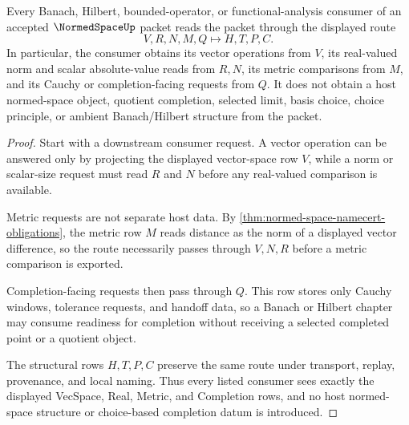 \begin{theorem}
\label{thm:normed-space-completion-handoff}
Every Banach, Hilbert, bounded-operator, or functional-analysis consumer of an accepted $\NormedSpaceUp$ packet reads the packet through the displayed route
$$
V,R,N,M,Q\longmapsto H,T,P,C .
$$
In particular, the consumer obtains its vector operations from $V$, its real-valued norm and scalar absolute-value reads from $R,N$, its metric comparisons from $M$, and its Cauchy or completion-facing requests from $Q$. It does not obtain a host normed-space object, quotient completion, selected limit, basis choice, choice principle, or ambient Banach/Hilbert structure from the packet.
\end{theorem}
\begin{proof}
Start with a downstream consumer request. A vector operation can be answered only by projecting the displayed vector-space row $V$, while a norm or scalar-size request must read $R$ and $N$ before any real-valued comparison is available.

Metric requests are not separate host data. By \autoref{thm:normed-space-namecert-obligations}, the metric row $M$ reads distance as the norm of a displayed vector difference, so the route necessarily passes through $V,N,R$ before a metric comparison is exported.

Completion-facing requests then pass through $Q$. This row stores only Cauchy windows, tolerance requests, and handoff data, so a Banach or Hilbert chapter may consume readiness for completion without receiving a selected completed point or a quotient object.

The structural rows $H,T,P,C$ preserve the same route under transport, replay, provenance, and local naming. Thus every listed consumer sees exactly the displayed VecSpace, Real, Metric, and Completion rows, and no host normed-space structure or choice-based completion datum is introduced.
\end{proof}

